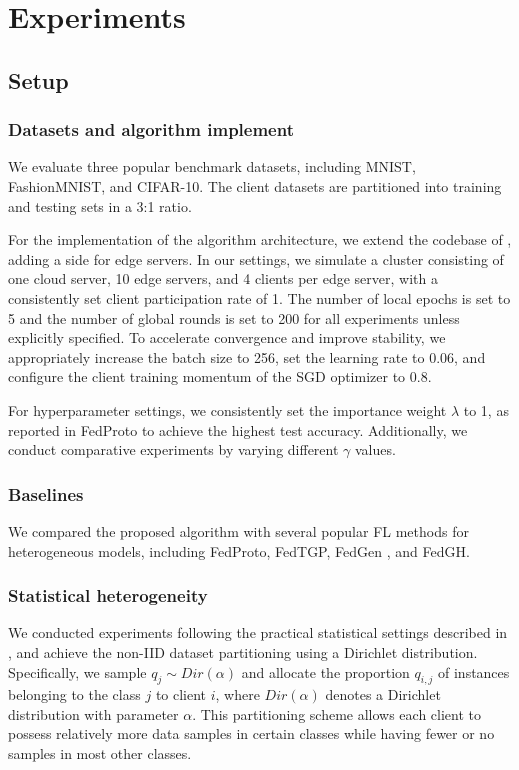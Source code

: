 \documentclass[journal]{IEEEtran}
\begin{document}
\section{Experiments}
\subsection{Setup}
\subsubsection{Datasets and algorithm implement}
We evaluate three popular benchmark datasets, including MNIST\cite{lecun1998mnist}, FashionMNIST\cite{xiao2017fashion}, and CIFAR-10\cite{krizhevsky2009learningcifar10}.  The client datasets are partitioned into training and testing sets in a 3:1 ratio.

For the implementation of the algorithm architecture, we extend the codebase of \cite{zhang2023pfllib}, adding a side for edge servers. In our settings, we simulate a cluster consisting of one cloud server, 10 edge servers, and 4 clients per edge server, with a consistently set client participation rate of 1. The number of local epochs is set to 5 and the number of global rounds is set to 200 for all experiments unless explicitly specified. To accelerate convergence and improve stability, we appropriately increase the batch size to 256, set the learning rate to 0.06, and configure the client training momentum of the SGD optimizer to 0.8.

For hyperparameter settings, we consistently set the importance weight $\lambda$ to 1, as reported in FedProto to achieve the highest test accuracy.  Additionally, we conduct comparative experiments by varying different $\gamma$ values. 
\subsubsection{Baselines}
We compared the proposed algorithm with several popular FL methods for heterogeneous models, including FedProto\cite{tan_fedproto_2021}, FedTGP\cite{zhang_fedtgp_2024}, FedGen\cite{zhu_data-free_fedgen_2021} , and  FedGH\cite{yi_fedgh_2023}.
\subsubsection{Statistical heterogeneity}
We conducted experiments following the practical statistical settings described in \cite{zhang_fedtgp_2024,li2021mode_moon}, and achieve the non-IID dataset partitioning using a Dirichlet distribution. Specifically, we sample \( q_j \sim Dir(\alpha) \) and allocate the proportion \( q_{i,j} \) of instances belonging to the class \( j \) to client \( i \), where \( Dir(\alpha) \) denotes a Dirichlet distribution with parameter \(\alpha\). This partitioning scheme allows each client to possess relatively more data samples in certain classes while having fewer or no samples in most other classes.
\end{document}
